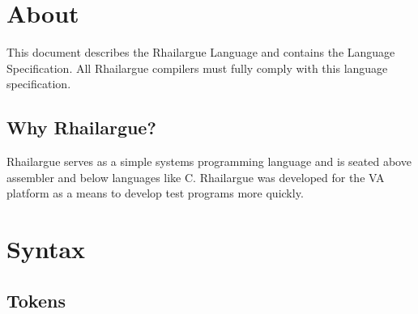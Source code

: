 \section{About}

This document describes the Rhailargue Language and contains the Language Specification. All Rhailargue compilers must fully comply
with this language specification. 

\subsection{Why Rhailargue?}

Rhailargue serves as a simple systems programming language and is seated above assembler and below languages like C. 
Rhailargue was developed for the VA platform as a means to develop test programs more quickly. 

\section{Syntax}

\subsection{Tokens}

